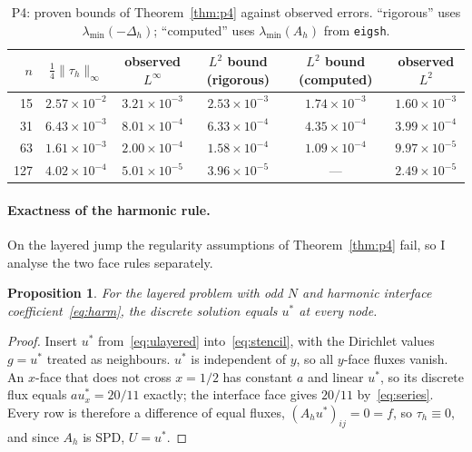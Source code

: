 \documentclass[11pt,a4paper]{article}
\newtheorem{proposition}{Proposition}
\begin{document}
\begin{table}[H]
\centering
\caption{P4: proven bounds of Theorem~\ref{thm:p4} against observed errors. ``rigorous'' uses \(\lambda_{\min}(-\Delta_h)\); ``computed'' uses \(\lambda_{\min}(A_h)\) from \texttt{eigsh}.}
\label{tab:bounds}
\begin{tabular}{@{}rccccc@{}}
\toprule
\(n\) & \(\tfrac14\|\tau_h\|_\infty\) & observed \(L^\infty\) & \(L^2\) bound (rigorous) & \(L^2\) bound (computed) & observed \(L^2\)\\
\midrule
15  & \(2.57\times 10^{-2}\) & \(3.21\times 10^{-3}\) & \(2.53\times 10^{-3}\) & \(1.74\times 10^{-3}\) & \(1.60\times 10^{-3}\)\\
31  & \(6.43\times 10^{-3}\) & \(8.01\times 10^{-4}\) & \(6.33\times 10^{-4}\) & \(4.35\times 10^{-4}\) & \(3.99\times 10^{-4}\)\\
63  & \(1.61\times 10^{-3}\) & \(2.00\times 10^{-4}\) & \(1.58\times 10^{-4}\) & \(1.09\times 10^{-4}\) & \(9.97\times 10^{-5}\)\\
127 & \(4.02\times 10^{-4}\) & \(5.01\times 10^{-5}\) & \(3.96\times 10^{-5}\) & ---                    & \(2.49\times 10^{-5}\)\\
\bottomrule
\end{tabular}
\end{table}

\paragraph{Exactness of the harmonic rule.}
On the layered jump the regularity assumptions of Theorem~\ref{thm:p4} fail, so I analyse the two face rules separately.

\begin{proposition}\label{prop:harm}
For the layered problem with odd \(N\) and harmonic interface coefficient~\eqref{eq:harm}, the discrete solution equals \(u^*\) at every node.
\end{proposition}
\begin{proof}
Insert \(u^*\) from~\eqref{eq:ulayered} into~\eqref{eq:stencil}, with the Dirichlet values \(g=u^*\) treated as neighbours.
\(u^*\) is independent of \(y\), so all \(y\)-face fluxes vanish.
An \(x\)-face that does not cross \(x=1/2\) has constant \(a\) and linear \(u^*\), so its discrete flux equals \(au^*_x=20/11\) exactly; the interface face gives \(20/11\) by~\eqref{eq:series}.
Every row is therefore a difference of equal fluxes, \((A_hu^*)_{ij}=0=f\), so \(\tau_h\equiv 0\), and since \(A_h\) is SPD, \(U=u^*\).
\end{proof}
\end{document}
